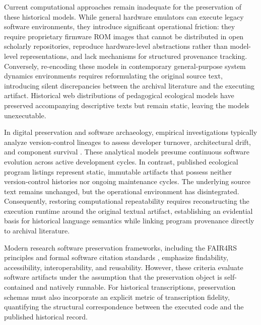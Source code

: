 \documentclass[3p,times,authoryear,twocolumn]{elsarticle}
\begin{document}
Current computational approaches remain inadequate for the preservation of these historical models. While general hardware emulators can execute legacy software environments, they introduce significant operational friction: they require proprietary firmware ROM images that cannot be distributed in open scholarly repositories, reproduce hardware-level abstractions rather than model-level representations, and lack mechanisms for structured provenance tracking. Conversely, re-encoding these models in contemporary general-purpose system dynamics environments \citep{richmond1985,fortmannRoe2014,vensim} requires reformulating the original source text, introducing silent discrepancies between the archival literature and the executing artifact. Historical web distributions of pedagogical ecological models \citep{ortega2007} have preserved accompanying descriptive texts but remain static, leaving the models unexecutable.

In digital preservation and software archaeology, empirical investigations typically analyze version-control lineages to assess developer turnover, architectural drift, and component survival \citep{huntThomas2002,robles2005,spinellis2021}. These analytical models presume continuous software evolution across active development cycles. In contrast, published ecological program listings represent static, immutable artifacts that possess neither version-control histories nor ongoing maintenance cycles. The underlying source text remains unchanged, but the operational environment has disintegrated. Consequently, restoring computational repeatability requires reconstructing the execution runtime around the original textual artifact, establishing an evidential basis for historical language semantics while linking program provenance directly to archival literature.

Modern research software preservation frameworks, including the FAIR4RS principles \citep{barker2022} and formal software citation standards \citep{smith2016}, emphasize findability, accessibility, interoperability, and reusability. However, these criteria evaluate software artifacts under the assumption that the preservation object is self-contained and natively runnable. For historical transcriptions, preservation schemas must also incorporate an explicit metric of transcription fidelity, quantifying the structural correspondence between the executed code and the published historical record.

\end{document}
